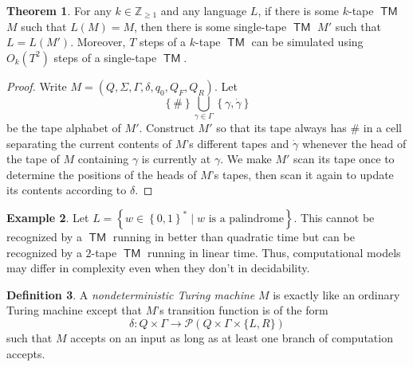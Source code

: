 \documentclass[10pt,letterpaper,cm]{nupset}
\theoremstyle{definition}
\newtheorem{definition}{Definition}[subsection]
\newtheorem{exmp}[definition]{Example}
\theoremstyle{theorem}
\newtheorem{theorem}[definition]{Theorem}
\theoremstyle{remark}
\renewcommand{\P}{\mathcal P}
\newcommand{\Z}{\mathbb Z}
\newcommand{\1}{\mathbf{1}}
\newcommand{\0}{\vec 0}
\DeclareMathOperator{\TM}{\mathsf{TM}}
\begin{document}
\begin{theorem}\label{equiv}
For any $k\in \Z_{\geq 1}$ and any language $L$, if there is some $k$-tape $\TM$ $M$ such that $L(M) = M$, then there is some single-tape $\TM$ $M'$ such that $L = L(M')$. Moreover, $T$ steps of a $k$-tape $\TM$ can be simulated using $O_k\left(T^2\right)$ steps of a single-tape $\TM$.
\end{theorem}
\begin{proof}
Write $M= \left(Q, \Sigma, \Gamma, \delta, q_0, Q_F, Q_R\right)$. Let $$ \left\{\#\right\} \bigcup_{\gamma \in \Gamma} \left\{\gamma, \dot{\gamma} \right\}$$ be the tape alphabet of $M'$. Construct $M'$ so that its tape always has $\#$ in a cell separating  the current contents of $M$'s different tapes and $\dot{\gamma}$ whenever the head of the tape of $M$ containing $\gamma$ is currently at $\gamma$. We make $M'$ scan its tape once to determine the positions of the heads of $M$'s tapes, then scan it again to update its contents according to $\delta$.
\end{proof}

\begin{exmp}
Let $L = \left\{w \in \left\{0,1\right\}^{\ast} \mid w \text{ is a palindrome}\right\}$. This cannot be recognized by a $\TM$ running in better than quadratic time  but can be recognized by a $2$-tape $\TM$ running in linear time.  Thus, computational models may differ in complexity even when they don't in decidability.
\end{exmp}

\begin{definition}
A \textit{nondeterministic Turing machine} $M$ is exactly like an ordinary Turing machine except that $M$'s transition function is of the form $$ \delta : Q \times \Gamma \to \P(Q \times \Gamma \times \{L, R\})  $$ such that $M$ accepts on an input as long as at least one branch of computation accepts.
\end{definition}
\end{document}
